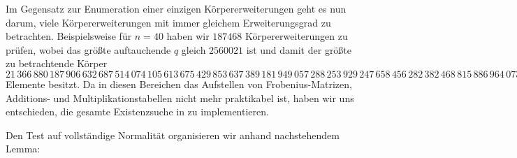 Im Gegensatz zur Enumeration einer einzigen Körpererweiterungen geht es nun
darum, viele Körpererweiterungen mit immer gleichem Erweiterungsgrad zu
betrachten. Beispielsweise für $n = 40$ haben wir 
$187468$ Körpererweiterungen zu prüfen, wobei das größte auftauchende $q$
gleich $2560021$ ist und damit der größte zu betrachtende Körper
$21\,\allowbreak
 366\,\allowbreak
 880\,\allowbreak
 187\,\allowbreak
 906\,\allowbreak
 632\,\allowbreak
 687\,\allowbreak
 514\,\allowbreak
 074\,\allowbreak
 105\,\allowbreak
 613\,\allowbreak
 675\,\allowbreak
 429\,\allowbreak
 853\,\allowbreak
 637\,\allowbreak
 389\,\allowbreak
 181\,\allowbreak
 949\,\allowbreak
 057\,\allowbreak
 288\,\allowbreak
 253\,\allowbreak
 929\,\allowbreak
 247\,\allowbreak
 658\,\allowbreak
 456\,\allowbreak
 282\,\allowbreak
 382\,\allowbreak
 468\,\allowbreak
 815\,\allowbreak
 886\,\allowbreak
 964\,\allowbreak
 073\,\allowbreak
 599\,\allowbreak
 674\,\allowbreak
 916\,\allowbreak
 653\,\allowbreak
 373\,\allowbreak
 765\,\allowbreak
 754\,\allowbreak
 199\,\allowbreak
 896\,\allowbreak
 430\,\allowbreak
 060\,\allowbreak
 696\,\allowbreak
 944\,\allowbreak
 213\,\allowbreak
 682\,\allowbreak
 519\,\allowbreak
 652\,\allowbreak
 698\,\allowbreak
 462\,\allowbreak
 471\,\allowbreak
 628\,\allowbreak
 340\,\allowbreak
 522\,\allowbreak
 570\,\allowbreak
 646\,\allowbreak
 913\,\allowbreak
 923\,\allowbreak
 734\,\allowbreak
 591\,\allowbreak
 660\,\allowbreak
 041\,\allowbreak
 323\,\allowbreak
 668\,\allowbreak
 864\,\allowbreak
 602\,\allowbreak
 928\,\allowbreak
 439\,\allowbreak
 707\,\allowbreak
 352\,\allowbreak
 577\,\allowbreak
 304\,\allowbreak
 227\,\allowbreak
 818\,\allowbreak
 869\,\allowbreak
 137\,\allowbreak
 311\,\allowbreak
 550\,\allowbreak
 893\,\allowbreak
 478\,\allowbreak
 904\,\allowbreak
 281\,\allowbreak
 581\,\allowbreak
 752\,\allowbreak
 801$
Elemente besitzt.
Da in diesen Bereichen das Aufstellen von Frobenius-Matrizen, Additions- und
Multiplikationstabellen nicht mehr praktikabel ist, haben wir uns entschieden,
die gesamte Existenzsuche in \sage zu implementieren.


Den Test auf vollständige Normalität organisieren wir anhand nachstehendem
Lemma: 

